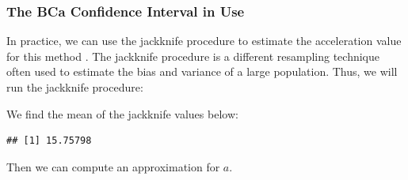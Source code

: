 \documentclass[12pt]{article}
\newenvironment{Shaded}{\begin{snugshade}}{\end{snugshade}}
\newcommand{\ControlFlowTok}[1]{\textcolor[rgb]{0.13,0.29,0.53}{\textbf{#1}}}
\newcommand{\DecValTok}[1]{\textcolor[rgb]{0.00,0.00,0.81}{#1}}
\newcommand{\FloatTok}[1]{\textcolor[rgb]{0.00,0.00,0.81}{#1}}
\newcommand{\FunctionTok}[1]{\textcolor[rgb]{0.00,0.00,0.00}{#1}}
\newcommand{\NormalTok}[1]{#1}
\newcommand{\OtherTok}[1]{\textcolor[rgb]{0.56,0.35,0.01}{#1}}
\newcommand{\SpecialCharTok}[1]{\textcolor[rgb]{0.00,0.00,0.00}{#1}}
\begin{document}
\hypertarget{the-bca-confidence-interval-in-use}{%
\subsubsection{The BCa Confidence Interval in
Use}\label{the-bca-confidence-interval-in-use}}

In practice, we can use the jackknife procedure to estimate the
acceleration value for this method \citep{EfronCasi}. The jackknife
procedure is a different resampling technique often used to estimate the
bias and variance of a large population. Thus, we will run the jackknife
procedure:

\begin{Shaded}
\end{Shaded}

We find the mean of the jackknife values below:

\begin{Shaded}
\end{Shaded}

\begin{verbatim}
## [1] 15.75798
\end{verbatim}

Then we can compute an approximation for \(a\).

\begin{Shaded}
\end{Shaded}
\end{document}
